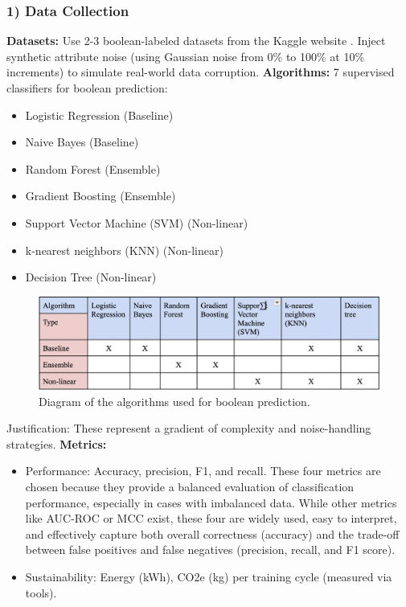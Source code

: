 \documentclass[conference]{IEEEtran}
\begin{document}
\subsubsection*{1) Data Collection}
\textbf{Datasets:} Use 2-3 boolean-labeled datasets from the Kaggle website \cite{kaggle}. Inject synthetic attribute noise (using Gaussian noise from 0\% to 100\% at 10\% increments) to simulate real-world data corruption.
\newline
\newline
\textbf{Algorithms:} 7 supervised classifiers for boolean prediction:
\begin{itemize}
    \item Logistic Regression (Baseline)
    \item Naive Bayes (Baseline)
    \item Random Forest (Ensemble)
    \item Gradient Boosting (Ensemble)
    \item Support Vector Machine (SVM) (Non-linear)
    \item k-nearest neighbors (KNN) (Non-linear)
    \item Decision Tree (Non-linear)
\end{itemize}

\begin{figure}[htbp]
    \centering
    \includegraphics[width=\linewidth, keepaspectratio]{img.png} %
    \caption{Diagram of the algorithms used for boolean prediction.}
    \label{fig:algorithms}
  \end{figure}
Justification: These represent a gradient of complexity and noise-handling strategies.
\newline
\newline
\textbf{Metrics:}
\begin{itemize}
    \item Performance: Accuracy, precision, F1, and recall. These four metrics are chosen because they provide a balanced evaluation of classification performance, especially in cases with imbalanced data. While other metrics like AUC-ROC or MCC exist, these four are widely used, easy to interpret, and effectively capture both overall correctness (accuracy) and the trade-off between false positives and false negatives (precision, recall, and F1 score).

    \item Sustainability: Energy (kWh), CO2e (kg) per training cycle (measured via tools).

\end{itemize}
\end{document}
